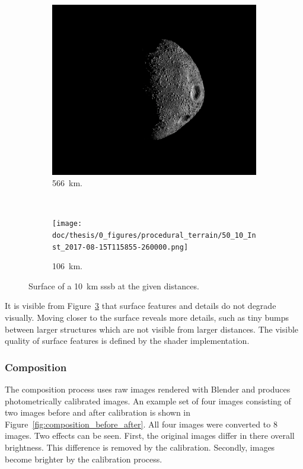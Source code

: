 \begin{figure}[htb]
    \centering
        \begin{subfigure}[b]{0.75\textwidth}
            \centering
            \includegraphics[width=\textwidth]{doc/thesis/0_figures/procedural_terrain/50_10_Inst_2017-08-15T115755-845000.png}
            \caption{\SI{566}{\kilo\meter}.}
            \label{fig:img_procedural_500}
        \end{subfigure}
        \\
        \begin{subfigure}[b]{0.75\textwidth}
            \centering
            \texttt{[image: doc/thesis/0\_figures/procedural\_terrain/50\_10\_Inst\_2017-08-15T115855-260000.png]}
            \caption{\SI{106}{\kilo\meter}.}
            \label{fig:img_procedural_100}
        \end{subfigure}
    \caption{Surface of a \SI{10}{\kilo\meter} \gls{sssb} at the given distances.}
    \label{fig:img_procedural_10k}
\end{figure}

It is visible from Figure~\ref{fig:img_procedural_10k} that surface features and details do not degrade visually. Moving closer to the surface reveals more details, such as tiny bumps between larger structures which are not visible from larger distances. The visible quality of surface features is defined by the shader implementation. 

\subsubsection{Composition}
The composition process uses raw images rendered with Blender and produces photometrically calibrated images. An example set of four images consisting of two images before and after calibration is shown in Figure~\ref{fig:composition_before_after}. All four images were converted to \SI{8}{\bit} images. Two effects can be seen. First, the original images differ in there overall brightness. This difference is removed by the calibration. Secondly, images become brighter by the calibration process. 

